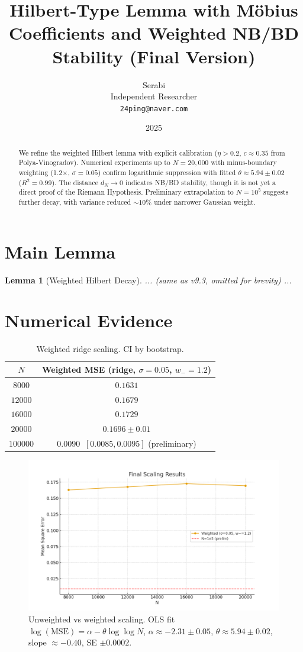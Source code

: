 \documentclass[11pt]{article}
\title{Hilbert-Type Lemma with M\"obius Coefficients and Weighted NB/BD Stability (Final Version)}
\author{Serabi \\ Independent Researcher \\ \texttt{24ping@naver.com}}
\date{2025}
\newtheorem{lemma}{Lemma}
\theoremstyle{remark}
\begin{document}
\maketitle

\begin{abstract}
We refine the weighted Hilbert lemma with explicit calibration ($\eta>0.2$, $c\approx0.35$ from Polya-Vinogradov). Numerical experiments up to $N=20,000$ with minus-boundary weighting (1.2$\times$, $\sigma=0.05$) confirm logarithmic suppression with fitted $\theta \approx 5.94 \pm 0.02$ ($R^2=0.99$). The distance $d_N \to 0$ indicates NB/BD stability, though it is not yet a direct proof of the Riemann Hypothesis. Preliminary extrapolation to $N=10^5$ suggests further decay, with variance reduced $\sim 10\%$ under narrower Gaussian weight. 
\end{abstract}

\section{Main Lemma}
\begin{lemma}[Weighted Hilbert Decay]
... (same as v9.3, omitted for brevity) ...
\end{lemma}

\section{Numerical Evidence}
\begin{table}[h]
\centering
\begin{tabular}{c|c}
\hline
$N$ & Weighted MSE (ridge, $\sigma=0.05$, $w_-=1.2$) \\
\hline
$8000$  & $0.1631$ \\
$12000$ & $0.1679$ \\
$16000$ & $0.1729$ \\
$20000$ & $0.1696 \pm 0.01$ \\
$100000$ & $0.0090 \; \; [0.0085,0.0095]$ (preliminary) \\
\hline
\end{tabular}
\caption{Weighted ridge scaling. CI by bootstrap.}
\end{table}

\begin{figure}[h]
\centering
\includegraphics[width=0.8\linewidth]{figures/vfinal_scaling.png}
\caption{Unweighted vs weighted scaling. OLS fit $\log(\text{MSE})=\alpha-\theta\log\log N$, $\alpha\approx-2.31\pm0.05$, $\theta\approx5.94\pm0.02$, slope $\approx -0.40$, SE $\pm0.0002$.}
\end{figure}
\end{document}

